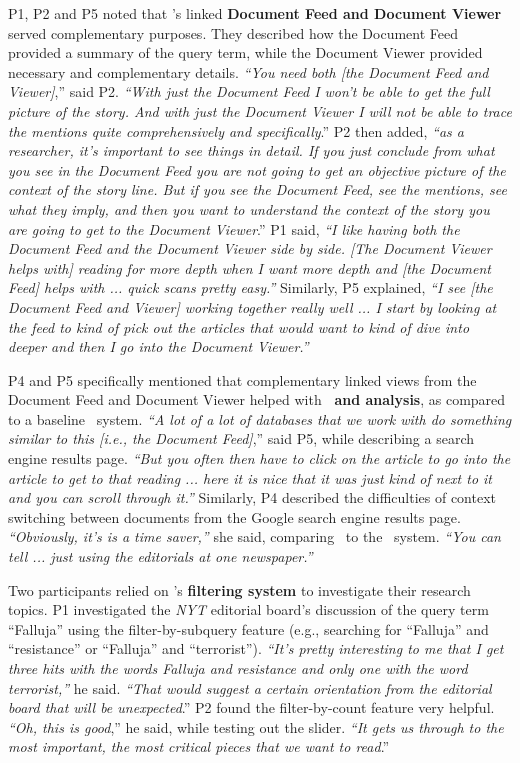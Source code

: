 P1, P2 and P5 noted that \ours's linked \textbf{Document Feed and Document Viewer} served complementary purposes. 
They described how the Document Feed provided a summary of the query term, while the Document Viewer provided necessary and complementary details. \textit{``You need both [the Document Feed and Viewer]},'' said P2. \textit{``With just the Document Feed I won’t be able to get the full picture of the story. And with just the Document Viewer I will not be able to trace the mentions quite comprehensively and specifically}.'' P2 then added, \textit{``as a researcher, it’s important to see things in detail. If you just conclude from what you see in the Document Feed you are not going to get an objective picture of the context of the story line. But if you see the Document Feed, see the mentions, see what they imply, and then you want to understand the context of the story you are going to get to the Document Viewer}.''  
P1 said, \textit{``I like having both the Document Feed and the Document Viewer side by side. [The Document Viewer helps with] reading for more depth when I want more depth and [the Document Feed] helps with ... quick scans pretty easy.''}  
Similarly, P5 explained, \textit{``I see [the Document Feed and Viewer] working together really well ...
I start by looking at the feed to kind of pick out the articles that would want to kind of dive into deeper and then I go into the Document Viewer.''}

P4 and P5 specifically mentioned that complementary linked views from the Document Feed and Document Viewer helped with \textbf{\burdensome~and analysis}, as compared to a baseline \Baselongname~system. 
\textit{``A lot of a lot of databases that we work with do something similar to this [i.e., the Document Feed]},'' said P5, while describing a search engine results page. 
\textit{``But you often then have to click on the article to go into the article to get to that reading ... here it is nice that it was just kind of next to it and you can scroll through it.''} 
Similarly, P4 described the difficulties of context switching between documents from the Google search engine results page. 
\textit{``Obviously, it's is a time saver,''} she said, comparing \ours~to the \Baselongname~system. 
\textit{``You can tell ... just using the editorials at one newspaper.''}

Two participants relied on \ours's \textbf{filtering system} to investigate their research topics. P1 investigated the \textit{NYT} editorial board's discussion of the query term ``Falluja'' using the filter-by-subquery feature (e.g., searching for ``Falluja'' and ``resistance'' or ``Falluja'' and ``terrorist''). \textit{``It's pretty interesting to me that I get three hits with the words Falluja and resistance and only one with the word terrorist,''} he said. \textit{``That would suggest a certain orientation from the editorial board that will be unexpected}.'' P2 found the filter-by-count feature very helpful. \textit{``Oh, this is good},'' he said, while testing out the slider. \textit{``It gets us through to the most important, the most critical pieces that we want to read}.'' 

